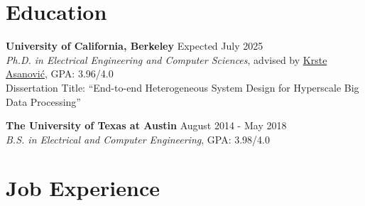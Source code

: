 \documentclass[line]{res}
\begin{document}
\address{\href{https://abejgonzalez.github.io}{https://abejgonzalez.github.io} $|$ \href{mailto:abe.gonzalez@berkeley.edu}{abe.gonzalez@berkeley.edu}}

\begin{resume}

\vspace{-6mm}

\section{\Large{Education}}
\label{sec:education}
\vspace{2mm}

\textbf{University of California, Berkeley} \hfill Expected July 2025
\\
\textit{Ph.D. in Electrical Engineering and Computer Sciences}, advised by \href{https://people.eecs.berkeley.edu/~krste/}{Krste Asanovi\'c}, GPA: 3.96/4.0
\\
Dissertation Title: ``End-to-end Heterogeneous System Design for Hyperscale Big Data Processing''

\textbf{The University of Texas at Austin} \hfill August 2014 - May 2018
\\
\textit{B.S. in Electrical and Computer Engineering}, GPA: 3.98/4.0

\section{\Large{Job Experience}}
\label{sec:jobs}
\vspace{2mm}


\end{resume}
\end{document}
